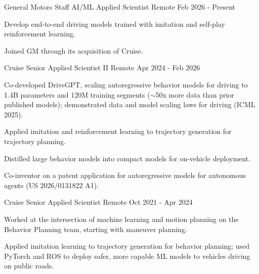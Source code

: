 


\begin{cventries}

\cventry
{General Motors}
{Staff AI/ML Applied Scientist}
{Remote}
{Feb 2026 - Present}
{
\begin{cvitems}
\item Develop end-to-end driving models trained with imitation and self-play reinforcement learning.
\item Joined GM through its acquisition of Cruise.
\end{cvitems}
}

\cventry
{Cruise}
{Senior Applied Scientist II}
{Remote}
{Apr 2024 - Feb 2026}
{
\begin{cvitems}
\item Co-developed DriveGPT, scaling autoregressive behavior models for driving to 1.4B parameters and 120M training segments ($\sim$50x more data than prior published models); demonstrated data and model scaling laws for driving (ICML 2025).
\item Applied imitation and reinforcement learning to trajectory generation for trajectory planning.
\item Distilled large behavior models into compact models for on-vehicle deployment.
\item Co-inventor on a patent application for autoregressive models for autonomous agents (US 2026/0131822 A1).
\end{cvitems}
}

\cventry
{Cruise}
{Senior Applied Scientist}
{Remote}
{Oct 2021 - Apr 2024}
{
\begin{cvitems}
\item Worked at the intersection of machine learning and motion planning on the Behavior Planning team, starting with maneuver planning.
\item Applied imitation learning to trajectory generation for behavior planning; used PyTorch and ROS to deploy safer, more capable ML models to vehicles driving on public roads.
\end{cvitems}
}


\end{cventries}
